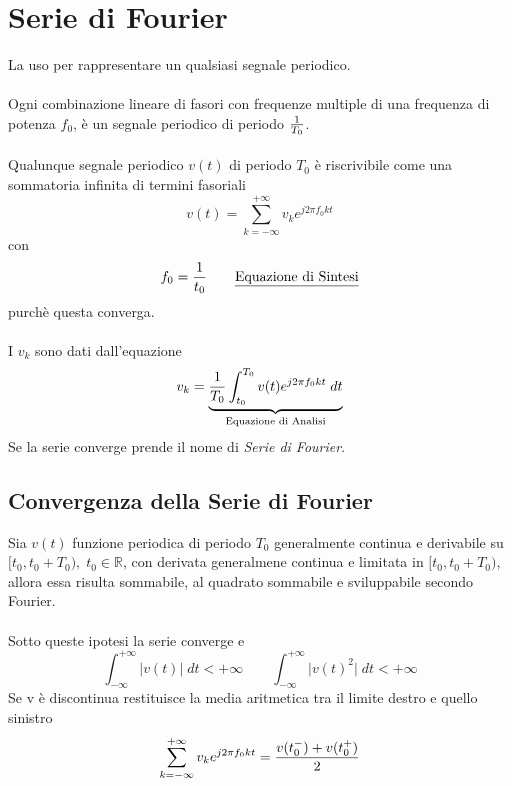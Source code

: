 \documentclass{article}
\begin{document}
	\newpage
	\section{Serie di Fourier}
		La uso per rappresentare un qualsiasi segnale periodico. \\
		\\
		Ogni combinazione lineare di fasori con frequenze multiple di una frequenza di potenza $ f_0 $, è un segnale periodico di periodo $ 1\over T_0 $. \\
		\\
		Qualunque segnale periodico $ v(t) $ di periodo $ T_0 $ è riscrivibile come una sommatoria infinita di termini fasoriali
		\[
			v(t) = \sum_{k=-\infty}^{+\infty} {v_ke^{j2\pi f_0 kt}}
		\]
		con
		\[
			f_0 = {{{1}\over{t_0}}\quad\quad \text{\underline{Equazione di Sintesi}}}
		\]
		purchè questa converga. \\
		\\
		I $ v_k $ sono dati dall'equazione
		\[
			v_k = \underbrace{{1\over{T_0}} \int_{t_0}^{T_0} {v(t) e^{j2\pi f_0 kt}\; dt}}_{\text{Equazione di Analisi}}
		\]
		Se la serie converge prende il nome di \textit{Serie di Fourier}.

		\subsection{Convergenza della Serie di Fourier}
			Sia $ v(t) $ funzione periodica di periodo $ T_0 $ generalmente continua e derivabile su $ [t_0, t_0 + T_0),\; t_0 \in \mathbb{R} $, con derivata generalmene continua e limitata in $ [t_0, t_0 + T_0) $, allora essa risulta sommabile, al quadrato sommabile e sviluppabile secondo Fourier. \\
			\\
			Sotto queste ipotesi la serie converge e
			\[
				\int_{-\infty}^{+\infty} {\vert v(t) \vert\; dt} < +\infty \quad\quad \int_{-\infty}^{+\infty} {\vert v(t)^2 \vert\; dt} < +\infty
			\]
			Se v è discontinua restituisce la media aritmetica tra il limite destro e quello sinistro
			\[
				\sum_{k=-\infty}^{+\infty} {v_k e^{j2\pi f_0 kt}} = {{v(t_{0}^{-}) + v(t_{0}^{+})}\over{2}}
			\]
\end{document}
